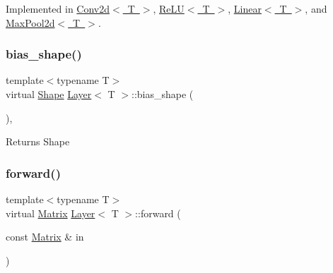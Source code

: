 Implemented in \mbox{\hyperlink{class_conv2d_ab5a54c023efbc6206b8f4aa355e5faa9}{Conv2d$<$ T $>$}}, \mbox{\hyperlink{class_re_l_u_aa634f43909614b979d84f5d4e5480bb4}{Re\+L\+U$<$ T $>$}}, \mbox{\hyperlink{class_linear_a747db1996e723fae7c9713d4b7f303af}{Linear$<$ T $>$}}, and \mbox{\hyperlink{class_max_pool2d_a05cc96411753ff4c0c79a1543af9e795}{Max\+Pool2d$<$ T $>$}}.

\mbox{\label{class_layer_ad557254136784e9312ebb197b2bd3faf}} 
\subsubsection{\texorpdfstring{bias\_shape()}{bias\_shape()}}
{\footnotesize\ttfamily template$<$typename T$>$ \\
virtual \mbox{\hyperlink{class_layer_a8313f42d2292d12dd5d40cc115636693}{Shape}} \mbox{\hyperlink{class_layer}{Layer}}$<$ T $>$\+::bias\+\_\+shape (\begin{DoxyParamCaption}{ }\end{DoxyParamCaption})\hspace{0.3cm}{\ttfamily [inline]}, {\ttfamily [virtual]}}

\begin{DoxyReturn}{Returns}
Shape 
\end{DoxyReturn}
\mbox{\label{class_layer_ab15b665c86974b1cf1d7ba4e309cb0e5}} 
\subsubsection{\texorpdfstring{forward()}{forward()}}
{\footnotesize\ttfamily template$<$typename T$>$ \\
virtual \mbox{\hyperlink{class_layer_a22b1e7286096aa62bd245536c8ebdaf1}{Matrix}} \mbox{\hyperlink{class_layer}{Layer}}$<$ T $>$\+::forward (\begin{DoxyParamCaption}\item[{const \mbox{\hyperlink{class_layer_a22b1e7286096aa62bd245536c8ebdaf1}{Matrix}} \&}]{in }\end{DoxyParamCaption})\hspace{0.3cm}{\ttfamily [pure virtual]}}




